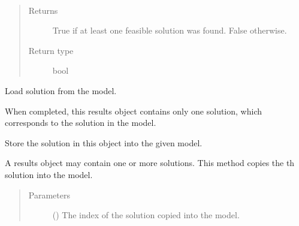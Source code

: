 \documentclass[letterpaper,10pt,english]{sphinxmanual}
\begin{document}
\begin{fulllineitems}
\begin{fulllineitems}
\label{\detokenize{reference/solverapi:pao.common.solver.Results.found_feasible_solution}}~\begin{quote}\begin{description}
\item[{Returns}] \leavevmode
True if at least one feasible solution was found. False otherwise.

\item[{Return type}] \leavevmode
bool

\end{description}\end{quote}

\end{fulllineitems}


\begin{fulllineitems}
\label{\detokenize{reference/solverapi:pao.common.solver.Results.load_from}}
Load solution from the model.

When completed, this results object contains only one solution, which corresponds
to the solution in the model.

\end{fulllineitems}


\begin{fulllineitems}
\label{\detokenize{reference/solverapi:pao.common.solver.Results.store_to}}
Store the solution in this object into the given model.

A results object may contain one or more solutions. This method
copies the \sphinxhyphen{}th solution into the model.
\begin{quote}\begin{description}
\item[{Parameters}] \leavevmode
{} () \textendash{} The index of the solution copied into the model.

\end{description}\end{quote}

\end{fulllineitems}


\end{fulllineitems}
\end{document}
